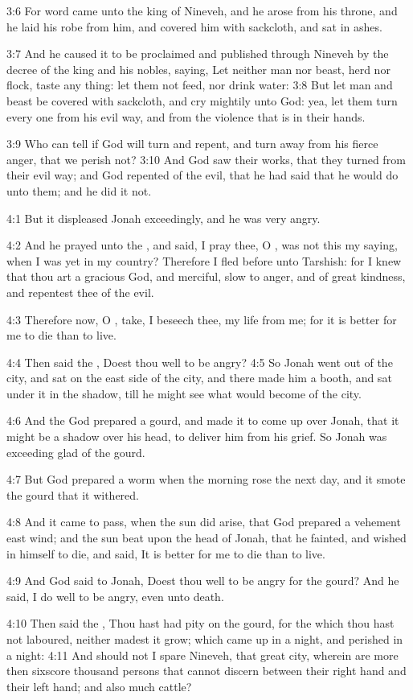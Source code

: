 3:6 For word came unto the king of Nineveh, and he arose from his throne, and he laid his robe from him, and covered him with sackcloth, and sat in ashes.

3:7 And he caused it to be proclaimed and published through Nineveh by the decree of the king and his nobles, saying, Let neither man nor beast, herd nor flock, taste any thing: let them not feed, nor drink water: 3:8 But let man and beast be covered with sackcloth, and cry mightily unto God: yea, let them turn every one from his evil way, and from the violence that is in their hands.

3:9 Who can tell if God will turn and repent, and turn away from his fierce anger, that we perish not?  3:10 And God saw their works, that they turned from their evil way; and God repented of the evil, that he had said that he would do unto them; and he did it not.

4:1 But it displeased Jonah exceedingly, and he was very angry.

4:2 And he prayed unto the \LORD, and said, I pray thee, O \LORD, was not this my saying, when I was yet in my country? Therefore I fled before unto Tarshish: for I knew that thou art a gracious God, and merciful, slow to anger, and of great kindness, and repentest thee of the evil.

4:3 Therefore now, O \LORD, take, I beseech thee, my life from me; for it is better for me to die than to live.

4:4 Then said the \LORD, Doest thou well to be angry?  4:5 So Jonah went out of the city, and sat on the east side of the city, and there made him a booth, and sat under it in the shadow, till he might see what would become of the city.

4:6 And the \LORD God prepared a gourd, and made it to come up over Jonah, that it might be a shadow over his head, to deliver him from his grief. So Jonah was exceeding glad of the gourd.

4:7 But God prepared a worm when the morning rose the next day, and it smote the gourd that it withered.

4:8 And it came to pass, when the sun did arise, that God prepared a vehement east wind; and the sun beat upon the head of Jonah, that he fainted, and wished in himself to die, and said, It is better for me to die than to live.

4:9 And God said to Jonah, Doest thou well to be angry for the gourd?  And he said, I do well to be angry, even unto death.

4:10 Then said the \LORD, Thou hast had pity on the gourd, for the which thou hast not laboured, neither madest it grow; which came up in a night, and perished in a night: 4:11 And should not I spare Nineveh, that great city, wherein are more then sixscore thousand persons that cannot discern between their right hand and their left hand; and also much cattle?


